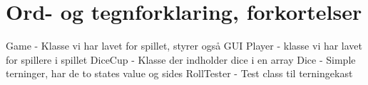 \newpage
\section{Ord- og tegnforklaring, forkortelser}

Game - Klasse vi har lavet for spillet, styrer også GUI
Player - klasse vi har lavet for spillere i spillet
DiceCup - Klasse der indholder dice i en array
Dice - Simple terninger, har de to states value og sides 
RollTester - Test class til terningekast